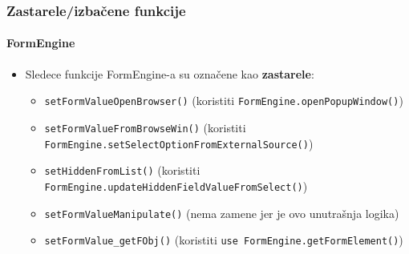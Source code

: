 \begin{frame}[fragile]
	\frametitle{Zastarele/izbačene funkcije}
	\framesubtitle{FormEngine}

	\lstset{basicstyle=\tiny\ttfamily}

	\begin{itemize}
		\item Sledece funkcije FormEngine-a su označene kao \textbf{zastarele}:

			\begin{itemize}
				\item \texttt{setFormValueOpenBrowser()}\newline
					\smaller(koristiti \texttt{FormEngine.openPopupWindow()})\small

				\item \texttt{setFormValueFromBrowseWin()}\newline
					\smaller(koristiti \texttt{FormEngine.setSelectOptionFromExternalSource()})\small

				\item \texttt{setHiddenFromList()}\newline
					\smaller(koristiti \texttt{FormEngine.updateHiddenFieldValueFromSelect()})\small

				\item \texttt{setFormValueManipulate()}\newline
					\smaller(nema zamene jer je ovo unutrašnja logika)\small

				\item \texttt{setFormValue\_getFObj()}\newline
					\smaller(koristiti \texttt{use FormEngine.getFormElement()})\small

			\end{itemize}

	\end{itemize}

\end{frame}


